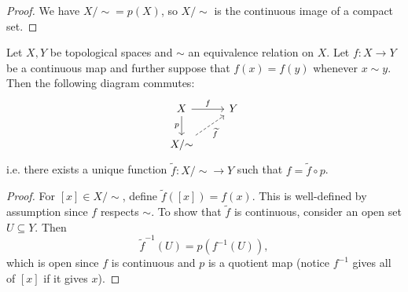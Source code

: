 \begin{proof}
  We have $X / {\sim} = p(X)$, so $X / {\sim}$ is
  the continuous image of a compact set.
\end{proof}

\begin{theorem}
  Let $X, Y$ be topological spaces and $\sim$ an
  equivalence relation on $X$. Let $f : X \to Y$ be
  a continuous map and
  further suppose
  that $f(x) = f(y)$ whenever $x \sim y$. Then
  the following diagram commutes:
  \[
    \begin{tikzcd}
      X \ar[r, "f"] \ar[d, "p", swap] & Y \\
      X / {\sim} \ar[ur, "\widetilde{f}"', dashed]
    \end{tikzcd}
  \]
  i.e. there exists a unique function
  $\widetilde{f} : X / {\sim} \to Y$
  such that $f = \widetilde{f} \circ p$.
\end{theorem}

\begin{proof}
  For $[x] \in X / {\sim}$, define
  $\widetilde{f}([x]) = f(x)$. This is well-defined
  by assumption since $f$ respects $\sim$. To
  show that $\widetilde{f}$ is continuous, consider
  an open set $U \subseteq Y$. Then
  \[
    \widetilde{f}^{-1}(U) = p(f^{-1}(U)),
  \]
  which is open since $f$ is continuous and
  $p$ is a quotient map (notice $f^{-1}$
  gives all of $[x]$ if it gives $x$).
\end{proof}

